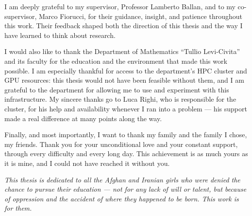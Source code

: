 I am deeply grateful to my supervisor, Professor Lamberto Ballan, and to my
co-supervisor, Marco Fiorucci, for their guidance, insight, and patience
throughout this work. Their feedback shaped both the direction of this thesis
and the way I have learned to think about research.

I would also like to thank the Department of Mathematics ``Tullio Levi-Civita''
and its faculty for the education and the environment that made this work
possible. I am especially thankful for access to the department's HPC cluster and
GPU resources: this thesis would not have been feasible without them, and I am
grateful to the department for allowing me to use and experiment with this
infrastructure. My sincere thanks go to Luca Righi, who is responsible for the
cluster, for his help and availability whenever I ran into a problem --- his
support made a real difference at many points along the way.

Finally, and most importantly, I want to thank my family and the family I chose,
my friends. Thank you for your unconditional love and your constant support,
through every difficulty and every long day. This achievement is as much yours as
it is mine, and I could not have reached it without you.

\vspace{2\baselineskip}
\begin{center}
\itshape
This thesis is dedicated to all the Afghan and Iranian girls who were denied the
chance to pursue their education --- not for any lack of will or talent, but
because of oppression and the accident of where they happened to be born. This
work is for them.
\end{center}
